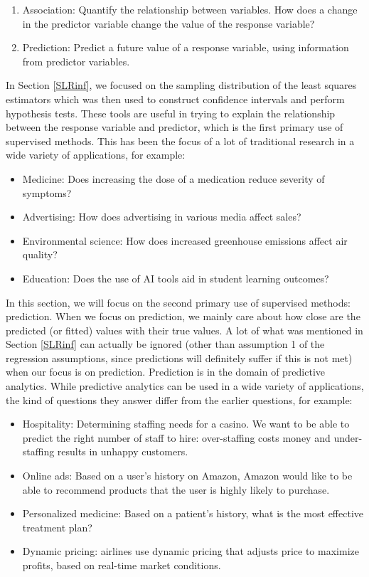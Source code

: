 \documentclass[
]{book}
\providecommand{\tightlist}{%
  \setlength{\itemsep}{0pt}\setlength{\parskip}{0pt}}
\begin{document}
\begin{enumerate}
\def\labelenumi{\arabic{enumi}.}
\tightlist
\item
  Association: Quantify the relationship between variables. How does a change in the predictor variable change the value of the response variable?
\item
  Prediction: Predict a future value of a response variable, using information from predictor variables.
\end{enumerate}

In Section \ref{SLRinf}, we focused on the sampling distribution of the least squares estimators which was then used to construct confidence intervals and perform hypothesis tests. These tools are useful in trying to explain the relationship between the response variable and predictor, which is the first primary use of supervised methods. This has been the focus of a lot of traditional research in a wide variety of applications, for example:

\begin{itemize}
\tightlist
\item
  Medicine: Does increasing the dose of a medication reduce severity of symptoms?
\item
  Advertising: How does advertising in various media affect sales?
\item
  Environmental science: How does increased greenhouse emissions affect air quality?
\item
  Education: Does the use of AI tools aid in student learning outcomes?
\end{itemize}

In this section, we will focus on the second primary use of supervised methods: prediction. When we focus on prediction, we mainly care about how close are the predicted (or fitted) values with their true values. A lot of what was mentioned in Section \ref{SLRinf} can actually be ignored (other than assumption 1 of the regression assumptions, since predictions will definitely suffer if this is not met) when our focus is on prediction. Prediction is in the domain of predictive analytics. While predictive analytics can be used in a wide variety of applications, the kind of questions they answer differ from the earlier questions, for example:

\begin{itemize}
\tightlist
\item
  Hospitality: Determining staffing needs for a casino. We want to be able to predict the right number of staff to hire: over-staffing costs money and under-staffing results in unhappy customers.
\item
  Online ads: Based on a user's history on Amazon, Amazon would like to be able to recommend products that the user is highly likely to purchase.
\item
  Personalized medicine: Based on a patient's history, what is the most effective treatment plan?
\item
  Dynamic pricing: airlines use dynamic pricing that adjusts price to maximize profits, based on real-time market conditions.
\end{itemize}
\end{document}
